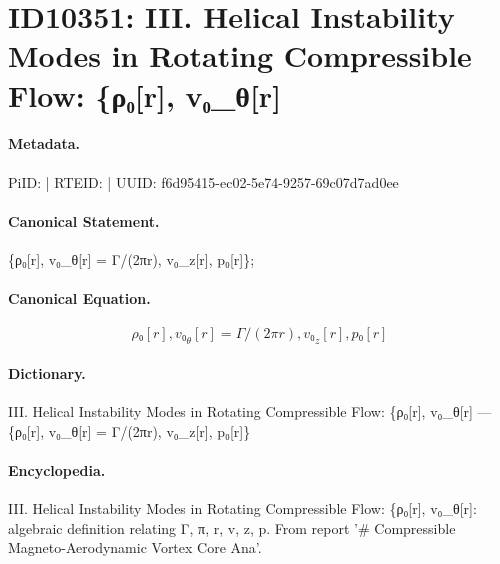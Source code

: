 \section*{ID10351: III. Helical Instability Modes in Rotating Compressible Flow: \{ρ₀[r], v₀\_θ[r]}
\paragraph{Metadata.}
PiID:  | RTEID:  | UUID: f6d95415-ec02-5e74-9257-69c07d7ad0ee

\paragraph{Canonical Statement.}
\{ρ₀[r], v₀\_θ[r] = Γ/(2πr), v₀\_z[r], p₀[r]\};

\paragraph{Canonical Equation.}
\[
{ρ₀[r], v₀_θ[r] = Γ/(2πr), v₀_z[r], p₀[r]}
\]

\paragraph{Dictionary.}
III. Helical Instability Modes in Rotating Compressible Flow: \{ρ₀[r], v₀\_θ[r] — \{ρ₀[r], v₀\_θ[r] = Γ/(2πr), v₀\_z[r], p₀[r]\}

\paragraph{Encyclopedia.}
III. Helical Instability Modes in Rotating Compressible Flow: \{ρ₀[r], v₀\_θ[r]: algebraic definition relating Γ, π, r, v, z, p. From report '\# Compressible Magneto-Aerodynamic Vortex Core Ana'.
